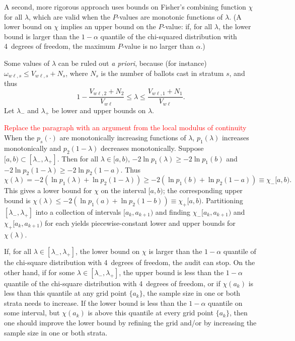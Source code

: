 \documentclass[runningheads]{llncs}
\newcommand{\beq}{\begin{equation}}
\newcommand{\eeq}{\end{equation}}
\newcommand{\comment}[1]{\textcolor{red}{\sc #1}}
\begin{document}
A second, more rigorous approach uses bounds on Fisher's combining function $\chi$ for all $\lambda$, 
which are valid when the $P$-values are monotonic functions of $\lambda$. 
(A lower bound on $\chi$ implies an upper bound on the $P$-value: if, for all $\lambda$, the lower bound is 
larger than the $1-\alpha$ quantile of the chi-squared distribution with 4~degrees of freedom, the maximum $P$-value is no larger than $\alpha$.)

Some values of $\lambda$ can be ruled out \emph{a priori}, because (for instance) $\omega_{w\ell,s} \le V_{w\ell,s}+N_s$, where $N_s$ is the number of ballots cast in stratum $s$, and thus
\beq
   1 - \frac{V_{w\ell,2}+N_2}{V_{w\ell}} \le \lambda \le \frac{V_{w\ell,1}+N_1}{V_{w\ell}}.
\eeq
Let $\lambda_-$ and $\lambda_+$ be lower and upper bounds on $\lambda$.

\comment{Replace the paragraph with an argument from the local modulus of continuity}
When the $p_s(\cdot)$ are monotonically increasing functions of $\lambda$, $p_1(\lambda)$ increases monotonically and $p_2(1-\lambda)$ decreases monotonically.
Suppose $[a, b) \subset [\lambda_-, \lambda_+]$.
Then for all $\lambda \in [a, b)$, $-2\ln p_1(\lambda) \ge -2\ln p_1(b)$ and
$-2\ln p_2(1-\lambda) \ge -2\ln p_2(1-a)$.
Thus
\beq\label{eq:lowerbound}
   \chi(\lambda) = -2(\ln p_1(\lambda)+ \ln p_2(1-\lambda))
          \ge -2(\ln p_1(b) + \ln p_2(1-a)) \equiv \chi_-[a,b).
\eeq
This gives a lower bound for $\chi$ on the interval $[a, b)$; the corresponding 
upper bound is $\chi(\lambda) \le -2(\ln p_1(a) + \ln p_2(1-b)) \equiv \chi_+[a,b)$.
Partitioning $[\lambda_-, \lambda_+]$ into a collection of intervals $[a_k, a_{k+1})$
and finding $\chi_-[a_k, a_{k+1})$ and $\chi_+[a_k, a_{k+1})$ for each
yields piecewise-constant lower and upper bounds for $\chi(\lambda)$.

If, for all $\lambda \in [\lambda_-, \lambda_+]$, the lower bound on $\chi$
is larger than the $1-\alpha$ quantile of the chi-square distribution with 4~degrees of freedom,
the audit can stop.
On the other hand, if for some $\lambda \in [\lambda_-, \lambda_+]$, 
the upper bound is less than the $1-\alpha$ quantile of the chi-square distribution with 4~degrees of freedom, 
or if $\chi(a_k)$ is less than this quantile at any grid point $\{a_k\}$,
the sample size in one or both strata needs to increase.
If the lower bound is less than the $1-\alpha$ quantile on some interval,
but $\chi(a_k)$ is above this quantile at every grid point $\{a_k\}$, then one should improve the lower bound by refining the grid and/or by increasing the sample size in one or both strata.
\end{document}
